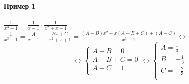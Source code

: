 \documentclass[12pt]{article}
\begin{document}
\newpage
{
	{\textbf{Пример 1}\\}
	\vspace{.2cm}\\
	$\frac{1}{x^3-1} = \frac{1}{x-1} \cdot \frac{1}{x^2+x+1}$\\
	$\frac{1}{x^3-1} = \frac{A}{x-1} + \frac{Bx+C}{x^2+x+1} = \frac{(A+B)x^2+x(A-B+C)+(A-C)}{x^3-1} \leftrightarrow$\\
	\begin{equation}
		\leftrightarrow
		\begin{cases}
			A+B=0\\
			A-B+C=0\\
			A-C=1\\
		\end{cases}
	\leftrightarrow
			\begin{cases}
				A = \frac{1}{3}\\
				B =  -\frac{1}{3}\\
				C = -\frac{2}{3}\\
			\end{cases}
	\end{equation}
}
\vspace{.75cm}\\
\end{document}
